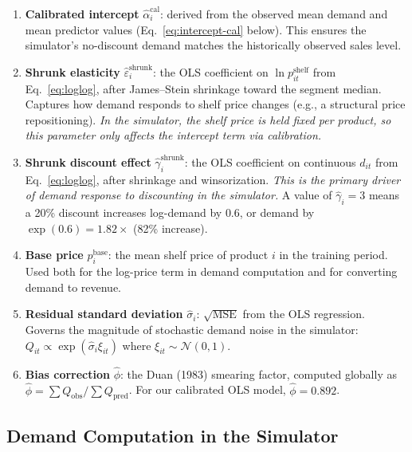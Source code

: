 \documentclass[12pt,a4paper]{article}
\begin{document}
\begin{enumerate}
\item \textbf{Calibrated intercept}
$\hat{\alpha}_i^{\text{cal}}$: derived from the observed mean
demand and mean predictor values (Eq.~\ref{eq:intercept-cal} below).
This ensures the simulator's no-discount demand matches the
historically observed sales level.

\item \textbf{Shrunk elasticity}
$\hat{\varepsilon}_i^{\text{shrunk}}$: the OLS coefficient on
$\ln p_{it}^{\text{shelf}}$ from Eq.~\eqref{eq:loglog}, after
James--Stein shrinkage toward the segment median. Captures how
demand responds to shelf price changes (e.g., a structural price
repositioning). \emph{In the simulator, the shelf price is held
fixed per product, so this parameter only affects the intercept
term via calibration.}

\item \textbf{Shrunk discount effect}
$\hat{\gamma}_i^{\text{shrunk}}$: the OLS coefficient on continuous
$d_{it}$ from Eq.~\eqref{eq:loglog}, after shrinkage and
winsorization. \emph{This is the primary driver of demand response
to discounting in the simulator.} A value of $\hat{\gamma}_i = 3$
means a 20\% discount increases log-demand by $0.6$, or demand by
$\exp(0.6) = 1.82\times$ (82\% increase).

\item \textbf{Base price} $p_i^{\text{base}}$: the mean shelf price
of product $i$ in the training period. Used both for the log-price
term in demand computation and for converting demand to revenue.

\item \textbf{Residual standard deviation} $\hat{\sigma}_i$:
$\sqrt{\text{MSE}}$ from the OLS regression. Governs the magnitude of
stochastic demand noise in the simulator:
$Q_{it} \propto \exp(\hat{\sigma}_i \xi_{it})$ where
$\xi_{it} \sim \mathcal{N}(0, 1)$.

\item \textbf{Bias correction} $\hat{\phi}$: the Duan (1983)
smearing factor, computed globally as
$\hat{\phi} = \sum Q_{\text{obs}} / \sum Q_{\text{pred}}$.
For our calibrated OLS model, $\hat{\phi} = 0.892$.
\end{enumerate}

\subsection{Demand Computation in the Simulator}
\label{sec:demand-computation}
\end{document}
